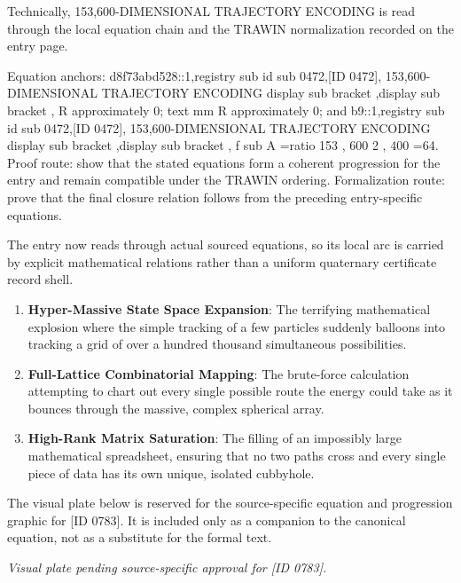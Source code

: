 Technically, 153,600-DIMENSIONAL TRAJECTORY ENCODING is read through the local equation chain and the TRAWIN normalization recorded on the entry page.

Equation anchors: d8f73abd528::1,registry sub id sub 0472,[ID 0472], 153,600-DIMENSIONAL TRAJECTORY ENCODING display sub bracket ,display sub bracket , R approximately 0; text mm R approximately 0; and b9::1,registry sub id sub 0472,[ID 0472], 153,600-DIMENSIONAL TRAJECTORY ENCODING display sub bracket ,display sub bracket , f sub A =ratio 153 , 600 2 , 400 =64. Proof route: show that the stated equations form a coherent progression for the entry and remain compatible under the TRAWIN ordering. Formalization route: prove that the final closure relation follows from the preceding entry-specific equations.

The entry now reads through actual sourced equations, so its local arc is carried by explicit mathematical relations rather than a uniform quaternary certificate record shell.
\endgroup

\begin{enumerate}[leftmargin=1.6em,itemsep=6pt,topsep=4pt]
\item \textbf{Hyper-Massive State Space Expansion}: The terrifying mathematical explosion where the simple tracking of a few particles suddenly balloons into tracking a grid of over a hundred thousand simultaneous possibilities.
\item \textbf{Full-Lattice Combinatorial Mapping}: The brute-force calculation attempting to chart out every single possible route the energy could take as it bounces through the massive, complex spherical array.
\item \textbf{High-Rank Matrix Saturation}: The filling of an impossibly large mathematical spreadsheet, ensuring that no two paths cross and every single piece of data has its own unique, isolated cubbyhole.
\end{enumerate}

\begingroup\footnotesize\sloppy
The visual plate below is reserved for the source-specific equation and progression graphic for [ID 0783]. It is included only as a companion to the canonical equation, not as a substitute for the formal text.
\par\endgroup
\begingroup\footnotesize\itshape
Visual plate pending source-specific approval for [ID 0783].
\par\endgroup

